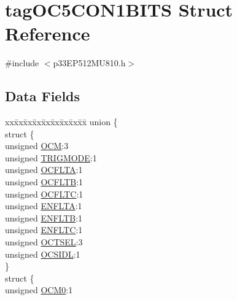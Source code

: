 \hypertarget{structtag_o_c5_c_o_n1_b_i_t_s}{}\section{tag\+O\+C5\+C\+O\+N1\+B\+I\+TS Struct Reference}
\label{structtag_o_c5_c_o_n1_b_i_t_s}


{\ttfamily \#include $<$p33\+E\+P512\+M\+U810.\+h$>$}

\subsection*{Data Fields}
\begin{DoxyCompactItemize}
\item 
\begin{tabbing}
xx\=xx\=xx\=xx\=xx\=xx\=xx\=xx\=xx\=\kill
union \{\\
\>struct \{\\
\>\>unsigned \hyperlink{structtag_o_c5_c_o_n1_b_i_t_s_a778fa0cf51a9477ac4e82d71a8733801}{OCM}:3\\
\>\>unsigned \hyperlink{structtag_o_c5_c_o_n1_b_i_t_s_a7a0057e0dca6e2663584b5b9e1da04c3}{TRIGMODE}:1\\
\>\>unsigned \hyperlink{structtag_o_c5_c_o_n1_b_i_t_s_acc967e41cecdeedc6ad4422f9ef1a6a3}{OCFLTA}:1\\
\>\>unsigned \hyperlink{structtag_o_c5_c_o_n1_b_i_t_s_a1fb30bb4421ef7c4bd0c66c379875593}{OCFLTB}:1\\
\>\>unsigned \hyperlink{structtag_o_c5_c_o_n1_b_i_t_s_a69a1772a4144abd579d17d28445b9934}{OCFLTC}:1\\
\>\>unsigned \hyperlink{structtag_o_c5_c_o_n1_b_i_t_s_a1e0f05fb23d516e003e4713fe8c1498a}{ENFLTA}:1\\
\>\>unsigned \hyperlink{structtag_o_c5_c_o_n1_b_i_t_s_a9d7aa97d5328b8b81ab7fd9145dfa0fc}{ENFLTB}:1\\
\>\>unsigned \hyperlink{structtag_o_c5_c_o_n1_b_i_t_s_a0b6f25c0f83f33b5501b6a2e6141a6ef}{ENFLTC}:1\\
\>\>unsigned \hyperlink{structtag_o_c5_c_o_n1_b_i_t_s_ae37d2a41dae2d2af1d82f7caae33cadb}{OCTSEL}:3\\
\>\>unsigned \hyperlink{structtag_o_c5_c_o_n1_b_i_t_s_afd05f4f249db4ef69b684e2f3fa6b703}{OCSIDL}:1\\
\>\} \\
\>struct \{\\
\>\>unsigned \hyperlink{structtag_o_c5_c_o_n1_b_i_t_s_a9271e84c9759ff10a7bc1cee3276e8f6}{OCM0}:1\\

\end{tabbing}
\end{DoxyCompactItemize}
